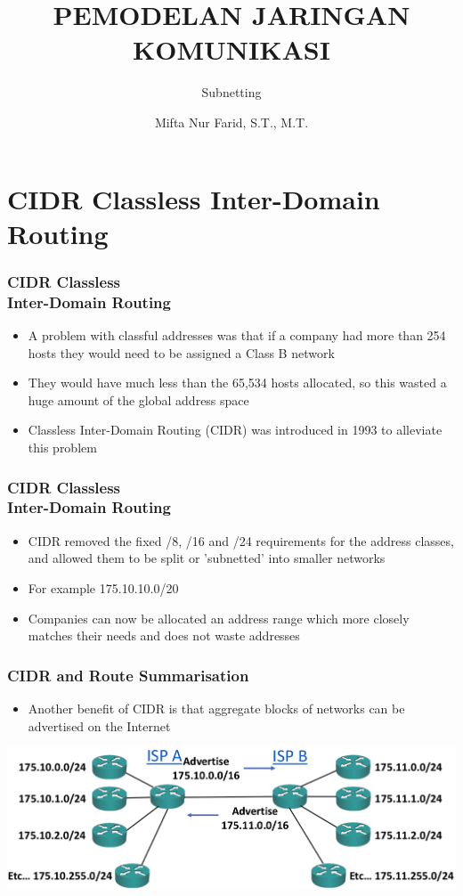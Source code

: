 \documentclass[pdflatex,compress]{beamer}
\title{PEMODELAN JARINGAN KOMUNIKASI}
\subtitle{Subnetting}
\author{Mifta Nur Farid, S.T., M.T.}
\begin{document}
\maketitle

\section{CIDR Classless Inter-Domain Routing}

\begin{frame}
	\frametitle{CIDR Classless\\Inter-Domain Routing}
	\begin{itemize}
		\item A problem with classful addresses was that if a company had more than 254 hosts they would need to be assigned a Class B network
		\item They would have much less than the 65,534 hosts allocated, so this wasted a huge amount of the global address space
		\item Classless Inter-Domain Routing (CIDR) was introduced in 1993 to alleviate this problem
	\end{itemize}
\end{frame}

\begin{frame}
	\frametitle{CIDR Classless\\Inter-Domain Routing}
	\begin{itemize}
		\item CIDR removed the fixed /8, /16 and /24 requirements for the address classes, and allowed them to be split or 'subnetted' into smaller networks
		\item For example 175.10.10.0/20
		\item Companies can now be allocated an address range which more closely matches their needs and does not waste addresses
	\end{itemize}
\end{frame}

\begin{frame}
	\frametitle{CIDR and Route Summarisation}
	\begin{itemize}
		\item Another benefit of CIDR is that aggregate blocks of networks can be advertised on the Internet
	\end{itemize}
	\begin{center}
		\includegraphics[width=1\linewidth]{img/img01}
	\end{center}
\end{frame}
\end{document}
